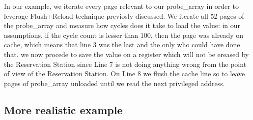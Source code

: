 \newline
In our example, we iterate every page relevant to our probe\_array in order to leverage Flush+Reload technique previosly discussed.
We iterate all 52 pages of the probe\_array and measure how cycles does it take to load the value: in our assumptions, if the cycle count
is lesser than 100, then the page was already on cache, which means that line 3 was the last and the only who could have done that.
we now procede to save the value on a register which will not be ereased by the Reservation Station since Line 7 is not doing anything wrong
from the point of view of the Reservation Station. On Line 8 we flush the cache line so to leave pages of probe\_array unloaded until we read the next privileged address.

\subsection{More realistic example}

